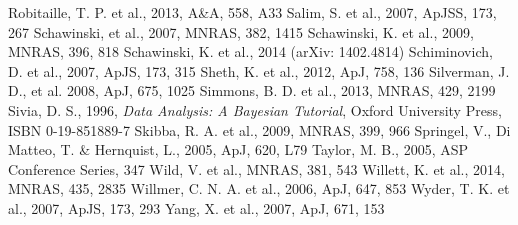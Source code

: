 \documentclass{mn2e}
\begin{document}
\begin{thebibliography}{}
 Robitaille, T. P. et al., 2013, A\&A, 558, A33
 Salim, S. et al., 2007, ApJSS, 173, 267
 Schawinski, et al., 2007, MNRAS, 382, 1415
 Schawinski, K. et al., 2009, MNRAS, 396, 818
 Schawinski, K. et al., 2014 (arXiv: 1402.4814)
 Schiminovich, D. et al., 2007, ApJS, 173, 315
 Sheth, K. et al., 2012, ApJ, 758, 136
 Silverman, J. D., et al. 2008, ApJ, 675, 1025
 Simmons, B. D. et al., 2013, MNRAS, 429, 2199
 Sivia, D. S., 1996, \emph{Data Analysis: A Bayesian Tutorial}, Oxford University Press, ISBN 0-19-851889-7
 Skibba, R. A. et al., 2009, MNRAS, 399, 966
 Springel, V., Di Matteo, T. \& Hernquist, L., 2005, ApJ, 620, L79
 Taylor, M. B., 2005, ASP Conference Series, 347
 Wild, V. et al., MNRAS, 381, 543
 Willett, K. et al., 2014, MNRAS, 435, 2835
 Willmer, C. N. A. et al., 2006, ApJ, 647, 853
 Wyder, T. K. et al., 2007, ApJS, 173, 293
 Yang, X. et al., 2007, ApJ, 671, 153
\end{thebibliography}{}
\end{document}
